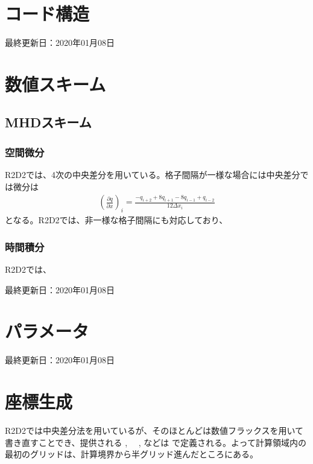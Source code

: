 \documentclass[letterpaper,10pt,dvipdfmx,report]{sphinxmanual}
\begin{document}
\chapter{コード構造}
\label{\detokenize{code:id1}}\label{\detokenize{code::doc}}
最終更新日：2020年01月08日


\chapter{数値スキーム}
\label{\detokenize{scheme:id1}}\label{\detokenize{scheme::doc}}

\section{MHDスキーム}
\label{\detokenize{scheme:mhd}}

\subsection{空間微分}
\label{\detokenize{scheme:id2}}
R2D2では、4次の中央差分を用いている。格子間隔が一様な場合には中央差分では微分は
\begin{equation*}
\begin{split}\left(\frac{\partial q}{\partial x}\right)_i =\frac{-q_{i+2}+8q_{i+1}-8q_{i-1}+q_{i-2}}{12\Delta x_i}\end{split}
\end{equation*}
となる。R2D2では、非一様な格子間隔にも対応しており、


\subsection{時間積分}
\label{\detokenize{scheme:id3}}
R2D2では、

最終更新日：2020年01月08日


\chapter{パラメータ}
\label{\detokenize{parameter:id1}}\label{\detokenize{parameter::doc}}
最終更新日：2020年01月08日


\chapter{座標生成}
\label{\detokenize{geometry:id1}}\label{\detokenize{geometry::doc}}
R2D2では中央差分法を用いているが、そのほとんどは数値フラックスを用いて書き直すことでき、提供される  , 　,  などは  で定義される。よって計算領域内の最初のグリッドは、計算境界から半グリッド進んだところにある。
\end{document}
